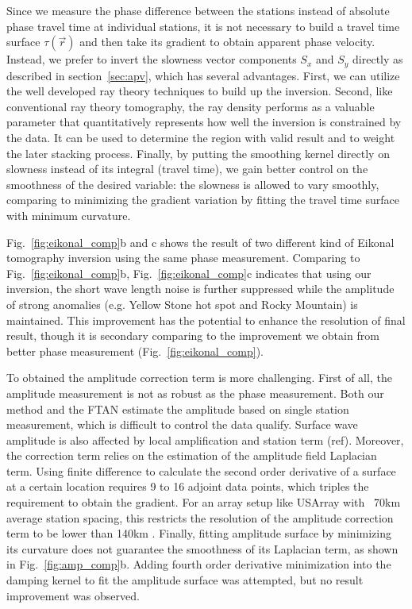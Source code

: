 \documentclass[referee]{gji}
\begin{document}
{{Since we measure the phase difference between the stations instead of absolute phase travel time at individual stations, it is not necessary to build a travel time surface $\tau(\vec{r})$ and then take its gradient to obtain apparent phase velocity. Instead, we prefer to invert the slowness vector components $S_x$ and $S_y$ directly as described in section~\ref{sec:apv}, which has several advantages. First, we can utilize the  well developed ray theory techniques to build up the inversion. Second, like conventional ray theory tomography, the ray density performs as a valuable parameter that quantitatively represents how well the inversion is constrained by the data. It can be used to determine the region with valid result and to weight the later stacking process. Finally, by putting the smoothing kernel directly on slowness instead of its integral (travel time), we gain better control on the smoothness of the desired variable: the slowness is allowed to vary smoothly, comparing to minimizing the gradient variation by fitting the travel time surface with minimum curvature. 

Fig.~\ref{fig:eikonal_comp}b and c shows the result of two different kind of Eikonal tomography inversion using the same phase measurement. Comparing to Fig.~\ref{fig:eikonal_comp}b, Fig.~\ref{fig:eikonal_comp}c indicates that using our inversion, the short wave length noise is further suppressed while the amplitude of strong anomalies (e.g. Yellow Stone hot spot and Rocky Mountain) is maintained. This improvement has the potential to enhance the resolution of final result, though it is secondary comparing to the improvement we obtain from better phase measurement (Fig.~\ref{fig:eikonal_comp}). 

To obtained the amplitude correction term is more challenging. First of all, the amplitude measurement is not as robust as the phase measurement. Both our method and the FTAN estimate the amplitude based on single station measurement, which is difficult to control the data qualify. Surface wave amplitude is also affected by local amplification and station term (ref). Moreover, the correction term  relies on the estimation of the amplitude field Laplacian term. Using finite difference to calculate the second order derivative of a surface at a certain location requires 9 to 16 adjoint data points, which triples the requirement to obtain the gradient. For an array setup like USArray with ~70km average station spacing, this restricts the resolution of the amplitude correction term to be lower than 140km \cite{Lin:2011fw}. Finally, fitting amplitude surface by minimizing its curvature does not guarantee the smoothness of its Laplacian term, as shown in Fig.~\ref{fig:amp_comp}b. Adding fourth order derivative minimization into the damping kernel to fit the amplitude surface was attempted, but no result improvement was observed.

}}
\end{document}
